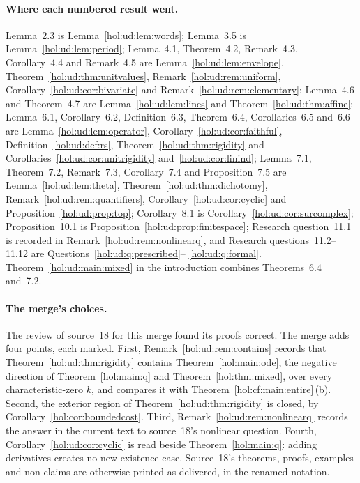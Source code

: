 \documentclass[11pt]{article}
\numberwithin{equation}{section}
\theoremstyle{definition}
\theoremstyle{remark}
\begin{document}
\paragraph{Where each numbered result went.}
Lemma~2.3 is Lemma~\ref{hol:ud:lem:words}; Lemma~3.5 is
Lemma~\ref{hol:ud:lem:period}; Lemma~4.1, Theorem~4.2, Remark~4.3,
Corollary~4.4 and Remark~4.5 are Lemma~\ref{hol:ud:lem:envelope},
Theorem~\ref{hol:ud:thm:unitvalues}, Remark~\ref{hol:ud:rem:uniform},
Corollary~\ref{hol:ud:cor:bivariate} and Remark~\ref{hol:ud:rem:elementary};
Lemma~4.6 and Theorem~4.7 are Lemma~\ref{hol:ud:lem:lines} and
Theorem~\ref{hol:ud:thm:affine}; Lemma~6.1, Corollary~6.2, Definition~6.3,
Theorem~6.4, Corollaries~6.5 and~6.6 are Lemma~\ref{hol:ud:lem:operator},
Corollary~\ref{hol:ud:cor:faithful}, Definition~\ref{hol:ud:def:rs},
Theorem~\ref{hol:ud:thm:rigidity} and
Corollaries~\ref{hol:ud:cor:unitrigidity} and~\ref{hol:ud:cor:linind};
Lemma~7.1, Theorem~7.2, Remark~7.3, Corollary~7.4 and Proposition~7.5 are
Lemma~\ref{hol:ud:lem:theta}, Theorem~\ref{hol:ud:thm:dichotomy},
Remark~\ref{hol:ud:rem:quantifiers}, Corollary~\ref{hol:ud:cor:cyclic} and
Proposition~\ref{hol:ud:prop:top}; Corollary~8.1 is
Corollary~\ref{hol:ud:cor:surcomplex}; Proposition~10.1 is
Proposition~\ref{hol:ud:prop:finitespace}; Research question~11.1 is recorded
in Remark~\ref{hol:ud:rem:nonlinearq}, and Research
questions~11.2--11.12 are Questions~\ref{hol:ud:q:prescribed}--%
\ref{hol:ud:q:formal}. Theorem~\ref{hol:ud:main:mixed} in the introduction
combines Theorems~6.4 and~7.2.

\paragraph{The merge's choices.}
The review of source~18 for this merge found its proofs correct. The merge
adds four points, each marked. First, Remark~\ref{hol:ud:rem:contains}
records that Theorem~\ref{hol:ud:thm:rigidity} contains
Theorem~\ref{hol:main:ode}, the negative direction of
Theorem~\ref{hol:main:q} and Theorem~\ref{hol:thm:mixed}, over every
characteristic-zero $k$, and compares it with
Theorem~\ref{hol:cf:main:entire}\,(b). Second, the exterior region of
Theorem~\ref{hol:ud:thm:rigidity} is closed, by
Corollary~\ref{hol:cor:boundedcost}. Third,
Remark~\ref{hol:ud:rem:nonlinearq} records the answer in the current text to
source~18's nonlinear question. Fourth, Corollary~\ref{hol:ud:cor:cyclic}
is read beside Theorem~\ref{hol:main:q}: adding derivatives creates no new
existence case. Source~18's theorems, proofs, examples and non-claims are
otherwise printed as delivered, in the renamed notation.
\end{document}
